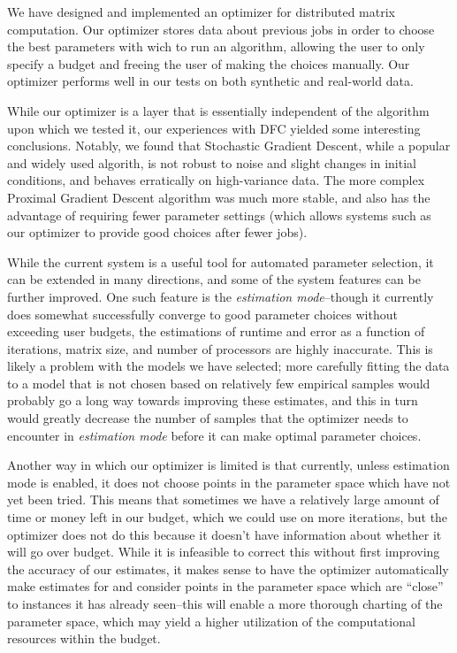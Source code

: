 We have designed and implemented an optimizer for distributed matrix 
computation. Our optimizer stores data about previous jobs in order to
choose the best parameters with wich to run an algorithm, allowing 
the user to only specify a budget and freeing the user of making 
the choices manually. Our optimizer performs well in our tests on both 
synthetic and real-world data.

While our optimizer is a layer that is essentially independent of 
the algorithm upon which we tested it, our experiences with DFC
yielded some interesting conclusions. Notably, we found that Stochastic
Gradient Descent, while a popular and widely used algorith, %
is not robust to noise and slight changes in initial conditions, and behaves
erratically on high-variance data. The more complex Proximal Gradient
Descent algorithm was much more stable, and also has the advantage of
requiring fewer parameter settings (which allows systems such as our
optimizer to provide good choices after fewer jobs).

While the current system is a useful tool for automated parameter selection,
it can be extended in many directions, and some of the system features
can be further improved. One such feature is the 
{\em estimation mode}--though it currently does somewhat successfully
converge to good parameter choices without exceeding user 
budgets, the estimations of runtime and error as a function of iterations,
matrix size, and number of processors are highly inaccurate. This is 
likely a problem with the models we have selected; more carefully fitting
the data to a model that is not chosen based on relatively few empirical
samples would probably go a long way towards improving these estimates,
and this in turn would greatly decrease the number of samples that 
the optimizer needs to encounter in {\em estimation mode} before it can
make optimal parameter choices. 

Another way in which our optimizer is limited is that currently, unless
estimation mode is enabled, it does not choose points in the parameter
space which have not yet been tried. 
This means that sometimes we have a relatively large amount of time or
money left in our budget, which we could use on more iterations, but the
optimizer does not do this because it doesn't have information about 
whether it will go over budget. 
While it is infeasible to correct this without first
improving the accuracy of our estimates, it makes sense to have
the optimizer automatically make estimates for and consider points in the
parameter space which are ``close'' 
to instances it has already seen--this will
enable a more thorough charting of the parameter space, which may yield
a higher utilization of the computational resources within the budget. 

